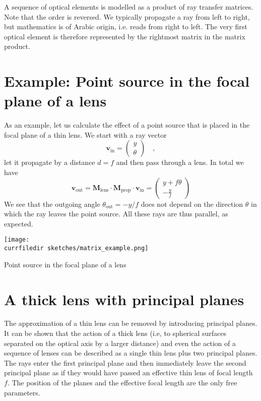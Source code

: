 A sequence of optical elements is modelled as a product of ray transfer matrices. Note that the order is reversed. We typically propagate a ray from left to right, but mathematics is of Arabic origin, i.e. reads from right to left. The very first optical element is therefore represented by the rightmost matrix in the matrix product.

\section{Example: Point source in the focal plane of a lens }

As an example, let us calculate the effect of a point source that is placed in the focal plane of a thin lens. We start with a ray vector
\begin{equation}
\boldsymbol{v}_\text{in} = 
    \begin{pmatrix}
        y \\ \theta
    \end{pmatrix}  \quad , 
\end{equation}
let it propagate by a distance $d=f$ and then pass through a lens. In total we have
\begin{equation}
    \boldsymbol{v}_\text{out} = \boldsymbol{M}_\text{lens} \cdot  \boldsymbol{M}_\text{prop} \cdot \boldsymbol{v}_\text{in}
    = 
    \begin{pmatrix}
        y  + f \theta \\ - \frac{y}{f}
    \end{pmatrix}
\end{equation}
We see that the outgoing angle $\theta_\text{out} = - y/f$ does not depend on the direction $\theta$ in which the ray leaves the point source. All these rays are thus parallel, as expected.

\begin{marginfigure}
    \texttt{[image: \\currfiledir sketches/matrix\_example.png]}
   \caption{Point source in the focal plane of a lens }
\end{marginfigure}



\section{A thick lens with principal planes}

The approximation of a thin lens can be removed by introducing principal planes. It can be shown that the action of a thick lens (i.e, to spherical surfaces separated on the optical axis by a larger distance) and even the action of a sequence of lenses can be described as a single thin lens plus two principal planes. The rays enter the first principal plane and then immediately leave the second principal plane as if they would have passed an effective thin lens of focal length $f$. The position of the planes and the effective focal length are the only free parameters.



